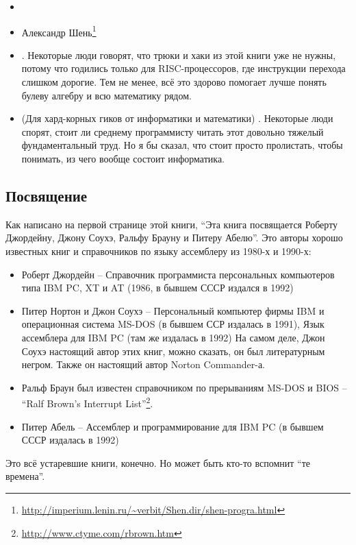 \begin{itemize}

\item \RobPikePractice

\item Александр Шень\footnote{\url{http://imperium.lenin.ru/~verbit/Shen.dir/shen-progra.html}}

\item \HenryWarren.
Некоторые люди говорят, что трюки и хаки из этой книги уже не нужны, потому что годились только для \ac{RISC}-процессоров,
где инструкции перехода слишком дорогие.
Тем не менее, всё это здорово помогает лучше понять булеву алгебру и всю математику рядом.

\item (Для хард-корных гиков от информатики и математики) \TAOCP.
Некоторые люди спорят, стоит ли среднему программисту читать этот довольно тяжелый фундаментальный труд.
Но я бы сказал, что стоит просто пролистать, чтобы понимать, из чего вообще состоит информатика.

\end{itemize}



\subsection{Посвящение}

Как написано на первой странице этой книги, ``Эта книга посвящается Роберту Джордейну, Джону Соухэ, Ральфу Брауну и Питеру Абелю''.
Это авторы хорошо известных книг и справочников по языку ассемблеру из 1980-х и 1990-х:

\begin{itemize}
\item Роберт Джордейн -- Справочник программиста персональных компьютеров типа IBM PC, XT и AT (1986, в бывшем СССР издался в 1992)

\item Питер Нортон и Джон Соухэ -- Персональный компьютер фирмы IBM и операционная система MS-DOS (в бывшем ССР издалась в 1991), Язык ассемблера для IBM PC (там же издалась в 1992)
На самом деле, Джон Соухэ настоящий автор этих книг, можно сказать, он был литературным негром.
Также он настоящий автор Norton Commander-а.

\item Ральф Браун был известен справочником по прерываниям MS-DOS и BIOS -- ``Ralf Brown's Interrupt List''\footnote{\url{http://www.ctyme.com/rbrown.htm}}.

\item Питер Абель -- Ассемблер и программирование для IBM PC (в бывшем СССР издалась в 1992)
\end{itemize}

Это всё устаревшие книги, конечно.
Но может быть кто-то вспомнит ``те времена''.

